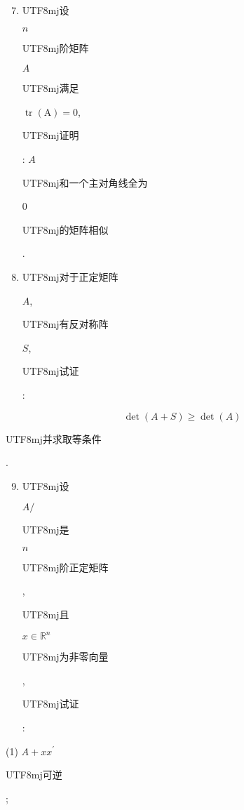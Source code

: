 \documentclass[10pt]{article}
\begin{document}
\begin{enumerate}
  \setcounter{enumi}{6}
  \item \begin{CJK}{UTF8}{mj}设\end{CJK} $n$ \begin{CJK}{UTF8}{mj}阶矩阵\end{CJK} $A$ \begin{CJK}{UTF8}{mj}满足\end{CJK} $\operatorname{tr}(\mathrm{A})=0$, \begin{CJK}{UTF8}{mj}证明\end{CJK}: $A$ \begin{CJK}{UTF8}{mj}和一个主对角线全为\end{CJK} 0 \begin{CJK}{UTF8}{mj}的矩阵相似\end{CJK}.

  \item \begin{CJK}{UTF8}{mj}对于正定矩阵\end{CJK} $A$, \begin{CJK}{UTF8}{mj}有反对称阵\end{CJK} $S$, \begin{CJK}{UTF8}{mj}试证\end{CJK}:

\end{enumerate}
$$
\operatorname{det}(A+S) \geq \operatorname{det}(A)
$$
\begin{CJK}{UTF8}{mj}并求取等条件\end{CJK}.

\begin{enumerate}
  \setcounter{enumi}{8}
  \item \begin{CJK}{UTF8}{mj}设\end{CJK} $A /$ \begin{CJK}{UTF8}{mj}是\end{CJK} $n$ \begin{CJK}{UTF8}{mj}阶正定矩阵\end{CJK}, \begin{CJK}{UTF8}{mj}且\end{CJK} $x \in \mathbb{R}^{n}$ \begin{CJK}{UTF8}{mj}为非零向量\end{CJK}, \begin{CJK}{UTF8}{mj}试证\end{CJK}:
\end{enumerate}
(1) $A+x x^{\prime}$ \begin{CJK}{UTF8}{mj}可逆\end{CJK};
\end{document}
